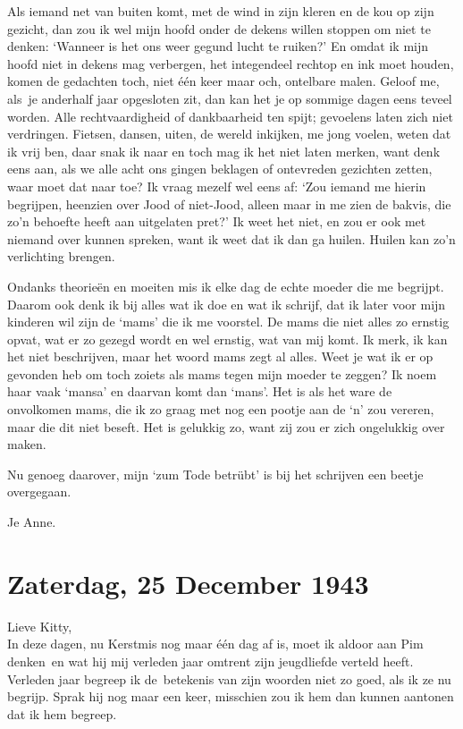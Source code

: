 \documentclass{book}
\begin{document}
Als iemand net van buiten komt, met de wind in zijn kleren en de kou op
zijn gezicht, dan zou ik wel mijn hoofd onder de dekens willen stoppen
om niet te denken: `Wanneer is het ons weer gegund lucht te ruiken?' En
omdat ik mijn hoofd niet in dekens mag verbergen, het integendeel
rechtop en ink moet houden, komen de gedachten toch, niet één keer maar
och, ontelbare malen. Geloof me, als~je anderhalf jaar opgesloten zit,
dan kan het je op sommige dagen eens teveel worden. Alle
rechtvaardigheid of dankbaarheid ten spijt; gevoelens laten zich niet
verdringen. Fietsen, dansen, uiten, de wereld inkijken, me jong voelen,
weten dat ik vrij ben, daar snak ik naar en toch mag ik het niet laten
merken, want denk eens aan, als we alle acht ons gingen beklagen of
ontevreden gezichten zetten, waar moet dat naar toe? Ik vraag mezelf wel
eens af: `Zou iemand me hierin begrijpen, heenzien over Jood of
niet-Jood, alleen maar in me zien de bakvis, die zo'n behoefte heeft aan
uitgelaten pret?' Ik weet het niet, en zou er ook met niemand over
kunnen spreken, want ik weet dat ik dan ga huilen. Huilen kan zo'n
verlichting brengen.

Ondanks theorieën en moeiten mis ik elke dag de echte moeder die me
begrijpt. Daarom ook denk ik bij alles wat ik doe en wat ik schrijf, dat
ik later voor mijn kinderen wil zijn de `mams' die ik me voorstel. De
mams die niet alles zo ernstig opvat, wat er zo gezegd wordt en wel
ernstig, wat van mij komt. Ik merk, ik kan het niet beschrijven, maar
het woord mams zegt al alles. Weet je wat ik er op gevonden heb om toch
zoiets als mams tegen mijn moeder te zeggen? Ik noem haar vaak `mansa'
en daarvan komt dan `mans'. Het is als het ware de onvolkomen mams, die
ik zo graag met nog een pootje aan de `n' zou vereren, maar die dit niet
beseft. Het is gelukkig zo, want zij zou er zich ongelukkig over maken.

Nu genoeg daarover, mijn `zum Tode betrübt' is bij het schrijven een
beetje overgegaan.

Je Anne.

\chapter{Zaterdag, 25 December 1943}

Lieve Kitty,\\In deze dagen, nu Kerstmis nog maar één dag af is, moet ik
aldoor aan Pim denken~en wat hij mij verleden jaar omtrent zijn
jeugdliefde verteld heeft. Verleden jaar begreep ik de~betekenis van
zijn woorden niet zo goed, als ik ze nu begrijp. Sprak hij nog maar een
keer, misschien zou ik hem dan kunnen aantonen dat ik hem begreep.
\end{document}
